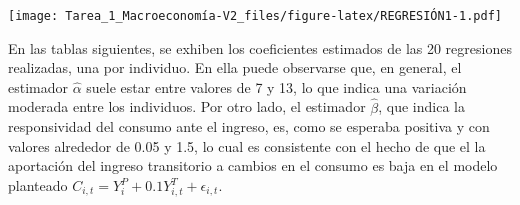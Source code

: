 \documentclass[
]{article}
\begin{document}
\texttt{[image: Tarea\_1\_Macroeconomía-V2\_files/figure-latex/REGRESIÓN1-1.pdf]}

En las tablas siguientes, se exhiben los coeficientes estimados de las
20 regresiones realizadas, una por individuo. En ella puede observarse
que, en general, el estimador \(\hat\alpha\) suele estar entre valores
de 7 y 13, lo que indica una variación moderada entre los individuos.
Por otro lado, el estimador \(\hat\beta\), que indica la responsividad
del consumo ante el ingreso, es, como se esperaba positiva y con valores
alrededor de 0.05 y 1.5, lo cual es consistente con el hecho de que el
la aportación del ingreso transitorio a cambios en el consumo es baja en
el modelo planteado \(C_{i,t}=Y_i^P+0.1Y_{i,t}^T+\epsilon_{i,t}\).

\newpage
\begin{landscape}



\end{landscape}
\end{document}
